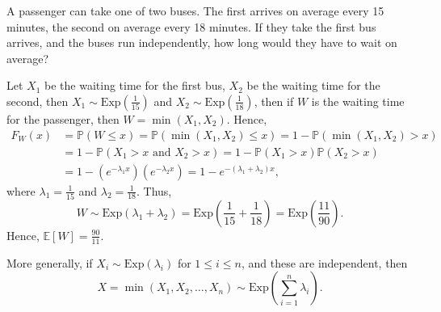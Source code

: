 \begin{eg}
    A passenger can take one of two buses. The first arrives on average every 15 minutes, the second on average every 18 minutes. If they take the first bus arrives, and the buses run independently, how long would they have to wait on average?
\end{eg}
\begin{explanation}
    Let \(X_1\) be the waiting time for the first bus, \(X_2\) be the waiting time for the second, then \(X_1 \sim \mathrm{Exp}(\frac{1}{15}) \) and \(X_2 \sim \mathrm{Exp}(\frac{1}{18}) \), then if \(W\) is the waiting time for the passenger, then \(W = \min (X_1, X_2)\). Hence,
    \begin{align*}
        F_W(x) &= \mathbb{P} (W \le x) = \mathbb{P} (\min (X_1, X_2) \le x) = 1 - \mathbb{P} (\min (X_1, X_2) > x) \\
        &= 1 - \mathbb{P} (X_1 > x \text{ and } X_2 > x) = 1 - \mathbb{P} (X_1 > x) \mathbb{P} (X_2 > x) \\
        &= 1 - (e^{-\lambda _1 x}) (e^{-\lambda _2 x}) = 1 - e^{-(\lambda _1 + \lambda _2) x},
    \end{align*}      
    where \(\lambda _1 = \frac{1}{15}\) and \(\lambda _2 = \frac{1}{18}\). Thus,
    \[
        W \sim \mathrm{Exp}(\lambda _1 + \lambda _2) = \mathrm{Exp}\left( \frac{1}{15} + \frac{1}{18} \right) = \mathrm{Exp}\left( \frac{11}{90} \right).     
    \]  
    Hence, \(\mathbb{E} [W] = \frac{90}{11}\). 

    \begin{remark}
        More generally, if \(X_i \sim \mathrm{Exp}(\lambda _i) \) for \(1 \le i \le n\), and these are independent, then 
        \[
            X = \min (X_1, X_2, \dots , X_n) \sim \mathrm{Exp} \left( \sum_{i=1}^n \lambda _i  \right).  
        \]  
    \end{remark}
\end{explanation}

